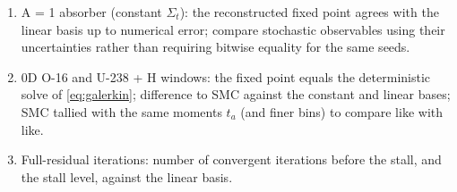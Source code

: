 \documentclass[11pt]{article}
\newcommand{\Sigt}{\Sigma_t}
\begin{document}
\begin{enumerate}
  \item A = 1 absorber (constant $\Sigt$): the reconstructed fixed point agrees
  with the linear basis up to numerical error; compare stochastic observables
  using their uncertainties rather than requiring bitwise equality for the same seeds.
  \item 0D O-16 and U-238 + H windows: the fixed point equals the deterministic solve of
  \eqref{eq:galerkin}; difference to SMC against the constant and linear bases; SMC
  tallied with the same moments $t_a$ (and finer bins) to compare like with like.
  \item Full-residual iterations: number of convergent iterations before the stall, and
  the stall level, against the linear basis.
\end{enumerate}
\end{document}
